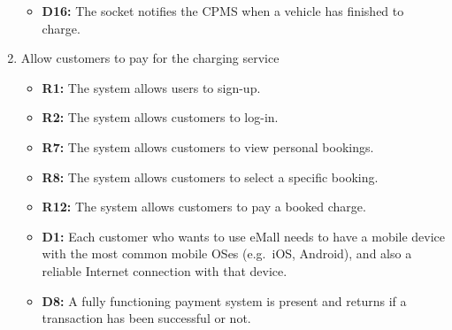 \begin{enumerate}[label=\textbf{-G\arabic*}:]
{\begin{itemize}
            \item \textbf{D16:} The socket notifies the CPMS when a vehicle has finished to charge.
          \end{itemize}
          }
    \item {Allow customers to pay for the charging service
          \begin{itemize}
            \item \textbf{R1:} The system allows users to sign-up.
            \item \textbf{R2:} The system allows customers to log-in.
            \item \textbf{R7:} The system allows customers to view personal bookings.
            \item \textbf{R8:} The system allows customers to select a specific booking.
            \item \textbf{R12:} The system allows customers to pay a booked charge.
            \item \textbf{D1:} Each customer who wants to use eMall needs to have a mobile device with the most common mobile OSes (e.g.\ iOS, Android), and also a reliable Internet connection with that device.
            \item \textbf{D8:} A fully functioning payment system is present and returns if a transaction has been successful or not.
              
          \end{itemize}
          }
    

\end{enumerate}
